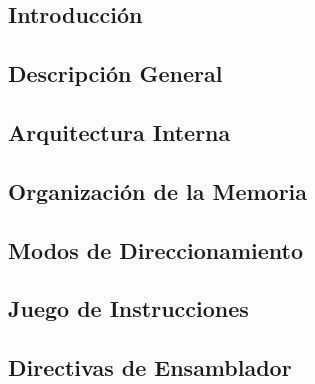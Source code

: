 \subsection{Introducción}
\subsection{Descripción General}
\subsection{Arquitectura Interna}
\subsection{Organización de la Memoria}
\subsection{Modos de Direccionamiento}
\subsection{Juego de Instrucciones}
\subsection{Directivas de Ensamblador}